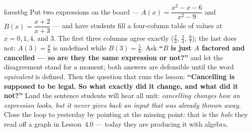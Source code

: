 \documentclass[10pt]{article}
\begin{document}
\begin{skillbox}[Hook]{forestbg}
    Put two expressions on the board --- $A(x)=\dfrac{x^2-x-6}{x^2-9}$ and $B(x)=\dfrac{x+2}{x+3}$ ---
    and have students fill a four-column table of values at $x=0,1,4$, and $3$. The first three columns
    agree exactly ($\tfrac23$, $\tfrac34$, $\tfrac67$); the last does not: $A(3)=\tfrac00$ is undefined
    while $B(3)=\tfrac56$. Ask \textbf{``$B$ is just $A$ factored and cancelled --- so are they the same
    expression or not?''} and let the disagreement stand for a moment; both answers are defensible
    until the word \emph{equivalent} is defined. Then the question that runs the lesson:
    \textbf{``Cancelling is supposed to be legal. So what exactly did it change, and what did it
    not?''} Land the sentence students will hear all unit: \emph{cancelling changes how an expression
    looks, but it never gives back an input that was already thrown away.} Close the loop to yesterday
    by pointing at the missing point: that is the \emph{hole} they read off a graph in Lesson~4.0 ---
    today they are producing it with algebra.
\end{skillbox}
\end{document}

